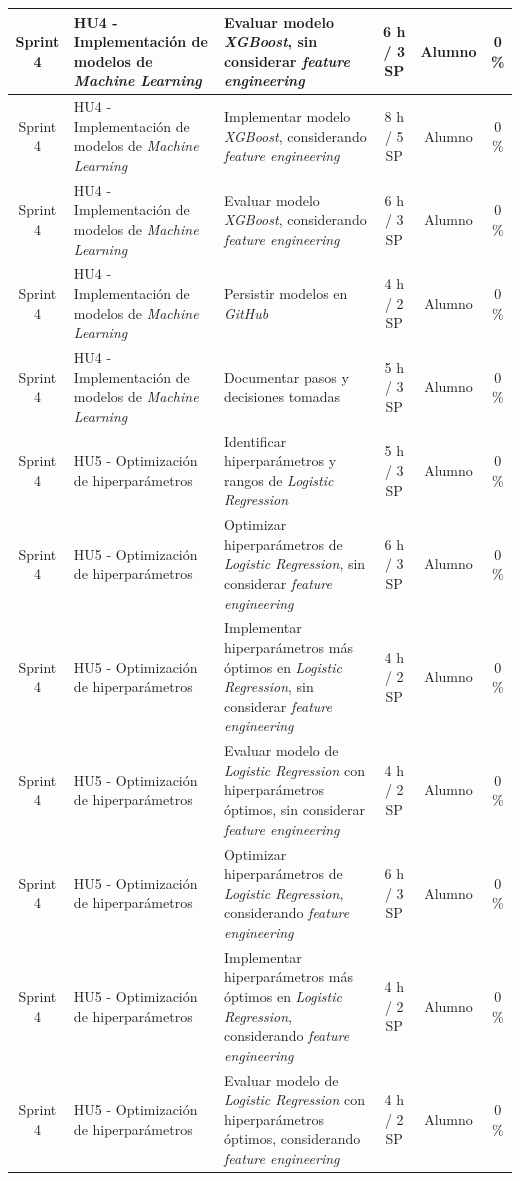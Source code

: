 \documentclass[
11pt, %
]{charter}
\begin{document}
\begin{xltabular}{\linewidth}{@{}|c|X|X|c|c|c|@{}}
Sprint 4 & HU4 - Implementación de modelos de \textit{Machine Learning} & Evaluar modelo \textit{XGBoost}, sin considerar \textit{feature engineering}  & 6 h / 3 SP & Alumno & 0 \%\\ \hline
Sprint 4 & HU4 - Implementación de modelos de \textit{Machine Learning} & Implementar modelo \textit{XGBoost}, considerando \textit{feature engineering}  & 8 h / 5 SP & Alumno & 0 \%\\ \hline
Sprint 4 & HU4 - Implementación de modelos de \textit{Machine Learning} & Evaluar modelo \textit{XGBoost}, considerando \textit{feature engineering}  & 6 h / 3 SP & Alumno & 0 \%\\ \hline
Sprint 4 & HU4 - Implementación de modelos de \textit{Machine Learning} & Persistir modelos en \textit{GitHub}  & 4 h / 2 SP & Alumno & 0 \%\\ \hline
Sprint 4 & HU4 - Implementación de modelos de \textit{Machine Learning} & Documentar pasos y decisiones tomadas  & 5 h / 3 SP & Alumno & 0 \%\\ \hline
Sprint 4 & HU5 - Optimización de hiperparámetros & Identificar hiperparámetros y rangos de \textit{Logistic Regression}  & 5 h / 3 SP & Alumno & 0 \%\\ \hline
Sprint 4 & HU5 - Optimización de hiperparámetros & Optimizar hiperparámetros de \textit{Logistic Regression}, sin considerar \textit{feature engineering}  & 6 h / 3 SP & Alumno & 0 \% \\ \hline
Sprint 4 & HU5 - Optimización de hiperparámetros & Implementar hiperparámetros más óptimos en \textit{Logistic Regression}, sin considerar \textit{feature engineering} & 4 h / 2 SP & Alumno & 0 \% \\ \hline
Sprint 4 & HU5 - Optimización de hiperparámetros & Evaluar modelo de \textit{Logistic Regression} con hiperparámetros óptimos, sin considerar \textit{feature engineering}  & 4 h / 2 SP & Alumno & 0 \% \\ \hline
Sprint 4 & HU5 - Optimización de hiperparámetros & Optimizar hiperparámetros de \textit{Logistic Regression}, considerando \textit{feature engineering}  & 6 h / 3 SP & Alumno & 0 \% \\ \hline
Sprint 4 & HU5 - Optimización de hiperparámetros & Implementar hiperparámetros más óptimos en \textit{Logistic Regression}, considerando \textit{feature engineering}  & 4 h / 2 SP & Alumno & 0 \% \\ \hline
Sprint 4 & HU5 - Optimización de hiperparámetros & Evaluar modelo de \textit{Logistic Regression} con hiperparámetros óptimos, considerando \textit{feature engineering}  & 4 h / 2 SP & Alumno & 0 \% \\ \hline

\end{xltabular}
\end{document}
